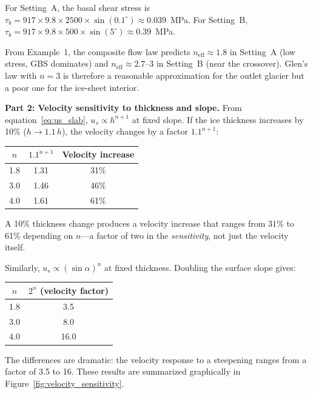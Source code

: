 \documentclass[11pt]{article}
\begin{document}
\noindent For Setting~A, the basal shear stress is $\tau_b = 917 \times 9.8 \times 2500 \times \sin(0.1^\circ) \approx 0.039$~MPa.  For Setting~B, $\tau_b = 917 \times 9.8 \times 500 \times \sin(5^\circ) \approx 0.39$~MPa.

\medskip
\noindent From Example~1, the composite flow law predicts $n_{\text{eff}} \approx 1.8$ in Setting~A (low stress, GBS dominates) and $n_{\text{eff}} \approx 2.7$--$3$ in Setting~B (near the crossover).  Glen's law with $n = 3$ is therefore a reasonable approximation for the outlet glacier but a poor one for the ice-sheet interior.

\medskip
\noindent\textbf{Part 2: Velocity sensitivity to thickness and slope.}  From equation~\eqref{eq:us_slab}, $u_s \propto h^{n+1}$ at fixed slope.  If the ice thickness increases by 10\% ($h \to 1.1\,h$), the velocity changes by a factor $1.1^{n+1}$:

\begin{center}
\begin{tabular}{ccc}
\toprule
$n$ & $1.1^{n+1}$ & Velocity increase \\
\midrule
1.8 & 1.31 & 31\% \\
3.0 & 1.46 & 46\% \\
4.0 & 1.61 & 61\% \\
\bottomrule
\end{tabular}
\end{center}

\noindent A 10\% thickness change produces a velocity increase that ranges from 31\% to 61\% depending on $n$---a factor of two in the \textit{sensitivity}, not just the velocity itself.

\medskip
\noindent Similarly, $u_s \propto (\sin\alpha)^n$ at fixed thickness.  Doubling the surface slope gives:

\begin{center}
\begin{tabular}{cc}
\toprule
$n$ & $2^n$ (velocity factor) \\
\midrule
1.8 & 3.5 \\
3.0 & 8.0 \\
4.0 & 16.0 \\
\bottomrule
\end{tabular}
\end{center}

\noindent The differences are dramatic: the velocity response to a steepening ranges from a factor of 3.5 to 16.  These results are summarized graphically in Figure~\ref{fig:velocity_sensitivity}.
\end{document}
